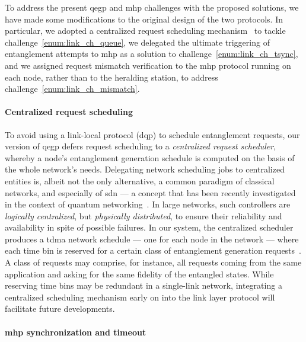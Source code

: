 To address the present \acrshort{qegp} and \acrshort{mhp} challenges with the proposed solutions, we
have made some modifications to the original design of the two protocols. In particular, we adopted
a centralized request scheduling mechanism~\cite{skrzypczyk_2021_arch} to tackle
challenge~\ref{enum:link_ch_queue}, we delegated the ultimate triggering of entanglement attempts to
\acrshort{mhp} as a solution to challenge~\ref{enum:link_ch_tsync}, and we assigned request mismatch
verification to the \acrshort{mhp} protocol running on each node, rather than to the heralding
station, to address challenge~\ref{enum:link_ch_mismatch}.

\paragraph{Centralized request scheduling}

To avoid using a link-local protocol (\acrshort{dqp}) to schedule entanglement requests, our version
of \acrshort{qegp} defers request scheduling to a \emph{centralized request scheduler}, whereby a
node's entanglement generation schedule is computed on the basis of the whole network's needs.
Delegating network scheduling jobs to centralized entities is, albeit not the only alternative, a
common paradigm of classical networks, and especially of \acrfull{sdn} --- a concept that has been
recently investigated in the context of quantum networking~\cite{aguado_2020_enabling,
kozlowski_2020_p4}. In large networks, such controllers are \emph{logically centralized}, but
\emph{physically distributed}, to ensure their reliability and availability in spite of possible
failures. In our system, the centralized scheduler produces a \acrfull{tdma} network schedule ---
one for each node in the network --- where each time bin is reserved for a certain class of
entanglement generation requests~\cite{skrzypczyk_2021_arch}. A class of requests may comprise, for
instance, all requests coming from the same application and asking for the same fidelity of the
entangled states. While reserving time bins may be redundant in a single-link network, integrating a
centralized scheduling mechanism early on into the link layer protocol will facilitate future
developments.

\paragraph{\acrshort{mhp} synchronization and timeout}

